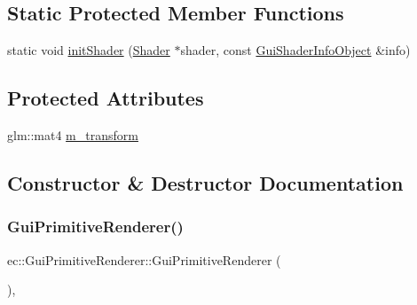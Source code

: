 \subsection*{Static Protected Member Functions}
\begin{DoxyCompactItemize}
\item 
static void \mbox{\hyperlink{classec_1_1_gui_primitive_renderer_a50485915bde54b1e786de6bd2017d4dd}{init\+Shader}} (\mbox{\hyperlink{classec_1_1_shader}{Shader}} $\ast$shader, const \mbox{\hyperlink{structec_1_1_gui_shader_info_object}{Gui\+Shader\+Info\+Object}} \&info)
\end{DoxyCompactItemize}
\subsection*{Protected Attributes}
\begin{DoxyCompactItemize}
\item 
glm\+::mat4 \mbox{\hyperlink{classec_1_1_gui_primitive_renderer_a7ebd149e4d4e0b043d928391041000bf}{m\+\_\+transform}}
\end{DoxyCompactItemize}


\subsection{Constructor \& Destructor Documentation}
\mbox{\label{classec_1_1_gui_primitive_renderer_ad5dec69952ed7ee82769fecb40a83fe8}} 
\subsubsection{\texorpdfstring{Gui\+Primitive\+Renderer()}{GuiPrimitiveRenderer()}}
{\footnotesize\ttfamily ec\+::\+Gui\+Primitive\+Renderer\+::\+Gui\+Primitive\+Renderer (\begin{DoxyParamCaption}{ }\end{DoxyParamCaption})\hspace{0.3cm}{\ttfamily [explicit]}, {\ttfamily [default]}}

\mbox{\label{classec_1_1_gui_primitive_renderer_abd5bd68a4ba482a2fa7ef9650c289ca8}} 
